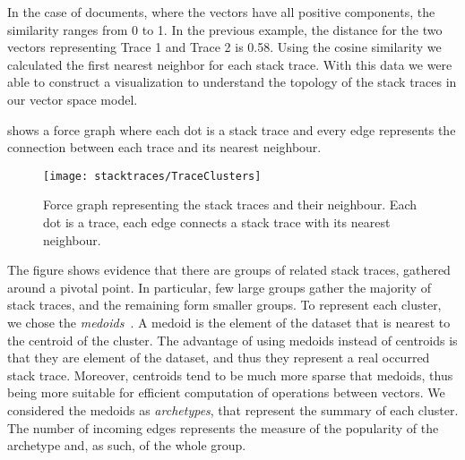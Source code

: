 In the case of documents, where the vectors have all positive components, the similarity ranges from 0 to 1.
In the previous example, the distance for the two vectors representing Trace 1 and Trace 2 is 0.58.
Using the cosine similarity we calculated the first nearest neighbor for each stack trace.
With this data we were able to construct a visualization to understand the topology of the stack traces in our vector space model.

 shows a force graph where each dot is a stack trace and every edge represents the connection between each trace and its nearest neighbour.

\begin{figure}[h!t]
\begin{center}
  \texttt{[image: stacktraces/TraceClusters]}
  \caption{Force graph representing the stack traces and their neighbour.
  Each dot is a trace, each edge connects a stack trace with its nearest neighbour.}
  \label{fig:eva-clusters}
\end{center}
\end{figure}

The figure shows evidence that there are groups of related stack traces, gathered around a pivotal point.
In particular, few large groups gather the majority of stack traces, and the remaining form smaller groups.
To represent each cluster, we chose the \emph{medoids}~\cite{Kauf1987}.
A medoid is the element of the dataset that is nearest to the centroid of the cluster.
The advantage of using medoids instead of centroids is that they are element of the dataset, and thus they represent a real occurred stack trace.
Moreover, centroids tend to be much more sparse that medoids, thus being more suitable for efficient computation of operations between vectors.
We considered the medoids as \emph{archetypes}, that represent the summary of each cluster.
The number of incoming edges represents the measure of the popularity of the archetype and, as such, of the whole group.

